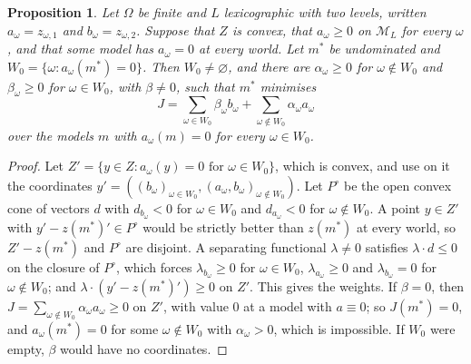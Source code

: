 \documentclass[11pt]{article}
\newtheorem{proposition}[theorem]{Proposition}
\theoremstyle{definition}
\theoremstyle{remark}
\newcommand{\M}{\mathcal M}
\begin{document}
\begin{proposition}\label{prop:lexbayes}
Let $\Omega$ be finite and $L$ lexicographic with two levels, written $a_\omega=z_{\omega,1}$ and $b_\omega=z_{\omega,2}$. Suppose that $Z$ is convex, that $a_\omega\ge0$ on $\M_L$ for every $\omega$, and that some model has $a_\omega=0$ at every world. Let $m^*$ be undominated and $W_0=\{\omega:a_\omega(m^*)=0\}$. Then $W_0\ne\varnothing$, and there are $\alpha_\omega\ge0$ for $\omega\notin W_0$ and $\beta_\omega\ge0$ for $\omega\in W_0$, with $\beta\neq0$, such that $m^*$ minimises
\[
 J=\sum_{\omega\in W_0}\beta_\omega b_\omega+\sum_{\omega\notin W_0}\alpha_\omega a_\omega
\]
over the models $m$ with $a_\omega(m)=0$ for every $\omega\in W_0$.
\end{proposition}
\begin{proof}
Let $Z'=\{y\in Z:a_\omega(y)=0\text{ for }\omega\in W_0\}$, which is convex, and use on it the coordinates $y'=((b_\omega)_{\omega\in W_0},(a_\omega,b_\omega)_{\omega\notin W_0})$. Let $P^\circ$ be the open convex cone of vectors $d$ with $d_{b_\omega}<0$ for $\omega\in W_0$ and $d_{a_\omega}<0$ for $\omega\notin W_0$. A point $y\in Z'$ with $y'-z(m^*)'\in P^\circ$ would be strictly better than $z(m^*)$ at every world, so $Z'-z(m^*)$ and $P^\circ$ are disjoint. A separating functional $\lambda\ne0$ satisfies $\lambda\cdot d\le0$ on the closure of $P^\circ$, which forces $\lambda_{b_\omega}\ge0$ for $\omega\in W_0$, $\lambda_{a_\omega}\ge0$ and $\lambda_{b_\omega}=0$ for $\omega\notin W_0$; and $\lambda\cdot(y'-z(m^*)')\ge0$ on $Z'$. This gives the weights. If $\beta=0$, then $J=\sum_{\omega\notin W_0}\alpha_\omega a_\omega\ge0$ on $Z'$, with value $0$ at a model with $a\equiv0$; so $J(m^*)=0$, and $a_\omega(m^*)=0$ for some $\omega\notin W_0$ with $\alpha_\omega>0$, which is impossible. If $W_0$ were empty, $\beta$ would have no coordinates.
\end{proof}
\end{document}
